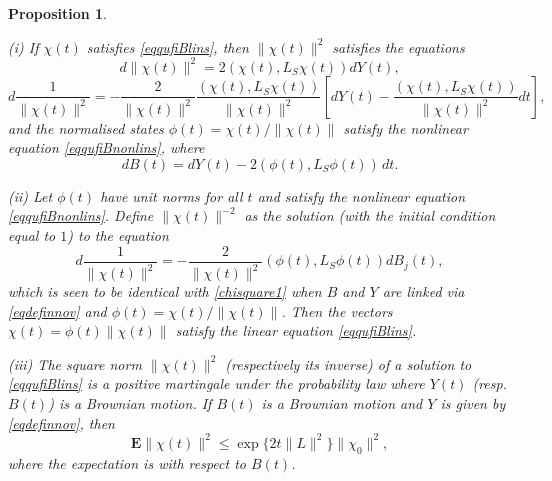 \documentclass[12pt]{article}
\def\E{\mathbf{E}}
\newtheorem{prop}{Proposition}[section]
\begin{document}
\begin{prop}
\label{linnorrmpure}

(i) If $\chi(t)$ satisfies \eqref{eqqufiBlins},
then $\|\chi(t)\|^2$ satisfies the equations
 \begin{equation}
\label{chisquare}
d\|\chi(t)\|^2=2(\chi(t),L_S \chi(t))dY(t),
\end{equation}
 \begin{equation}
\label{chisquare1}
d\frac{1}{\|\chi(t)\|^2}=-\frac{2}{\|\chi(t)\|^2}
 \frac{(\chi(t),L_S \chi(t))}{\|\chi(t)\|^2}
\left[dY(t)- \frac{(\chi(t),L_S \chi(t))}{\|\chi(t)\|^2} dt\right],
\end{equation}
and the normalised states $\phi(t)=\chi(t)/\|\chi(t)\|$ satisfy the
nonlinear equation \eqref{eqqufiBnonlins}, where
\begin{equation}
\label{eqdefinnov1}
dB(t)=dY(t)-2(\phi(t), L_S \phi(t)) \, dt.
\end{equation}

(ii) Let $\phi(t)$ have unit norms for all $t$ and satisfy the
nonlinear equation \eqref{eqqufiBnonlins}. Define $\|\chi(t)\|^{-2}$ as the solution
(with the initial condition equal to $1$) to the equation
 \begin{equation}
\label{chisquare4}
d\frac{1}{\|\chi(t)\|^2}=-\frac{2}{\|\chi(t)\|^2}
(\phi(t),L_S \phi(t)) dB_j(t),
\end{equation}
which is seen to be identical with \eqref{chisquare1}
when $B$ and $Y$ are linked via \eqref{eqdefinnov} and $\phi(t)=\chi(t)/\|\chi(t)\|$.
 Then the vectors
$\chi(t)=\phi(t) \|\chi(t)\|$ satisfy the linear equation \eqref{eqqufiBlins}.

(iii) The square norm $\|\chi(t)\|^2$ (respectively its inverse) of a solution
to \eqref{eqqufiBlins} is a positive martingale under
the probability law where $Y(t)$ (resp. $B(t)$) is a Brownian motion. If $B(t)$ is
a Brownian motion and $Y$ is given by \eqref{eqdefinnov}, then
 \begin{equation}
\label{chisquare5}
\E \|\chi(t)\|^2 \le \exp\{2 t \|L\|^2 \} \|\chi_0\|^2,
\end{equation}
where the expectation is with respect to $B(t)$.
\end{prop}
\end{document}
